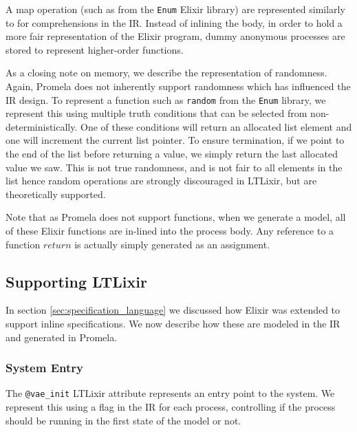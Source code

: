 \par
A map operation (such as from the \texttt{Enum} Elixir library) are represented similarly to for comprehensions in the IR. Instead of inlining the body, in order to hold a more fair representation of the Elixir program, dummy anonymous processes are stored to represent higher-order functions.
\par
As a closing note on memory, we describe the representation of randomness. Again, Promela does not inherently support randomness which has influenced the IR design. To represent a function such as \texttt{random} from the \texttt{Enum} library, we represent this using multiple truth conditions that can be selected from non-deterministically. One of these conditions will return an allocated list element and one will increment the current list pointer. To ensure termination, if we point to the end of the list before returning a value, we simply return the last allocated value we saw. This is not true randomness, and is not fair to all elements in the list hence random operations are strongly discouraged in LTLixir, but are theoretically supported.
\par
Note that as Promela does not support functions, when we generate a model, all of these Elixir functions are in-lined into the process body. Any reference to a function $return$ is actually simply generated as an assignment.

\subsection{Supporting LTLixir} \label{sec:supporting_ltl}
In section \ref{sec:specification_language} we discussed how Elixir was extended to support inline specifications. We now describe how these are modeled in the IR and generated in Promela.
\par
\subsubsection{System Entry}
The \texttt{@vae\_init} LTLixir attribute represents an entry point to the system. We represent this using a flag in the IR for each process, controlling if the process should be running in the first state of the model or not.
\par
